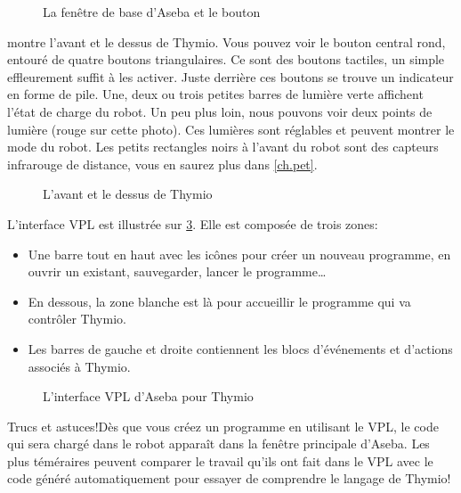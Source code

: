 \begin{figure}
\begin{center}
\caption{La fenêtre de base d'Aseba et le bouton }\label{fig.Aseba}
\end{center}
\end{figure} 


 montre l'avant et le dessus de Thymio. Vous pouvez voir le bouton central rond, entouré de quatre boutons triangulaires. Ce sont des boutons tactiles, un simple effleurement suffit à les activer. Juste derrière ces boutons se trouve un indicateur en forme de pile. Une, deux ou trois petites barres de lumière verte affichent l'état de charge du robot. Un peu plus loin, nous pouvons voir deux points de lumière (rouge sur cette photo). Ces lumières sont réglables et peuvent montrer le mode du robot. Les petits rectangles noirs à l'avant du robot sont des capteurs infrarouge de distance, vous en saurez plus dans \cref{ch.pet}.

\begin{figure}[h]
\begin{center}
\caption{L'avant et le dessus de Thymio}\label{fig.front}
\end{center}
\end{figure} 


L'interface VPL est illustrée sur \cref{fig.gui}. Elle est composée de trois zones:

\begin{itemize}
	\item Une barre tout en haut avec les icônes pour créer un nouveau programme, en ouvrir un existant, sauvegarder, lancer le programme\ldots
	\item En dessous, la zone blanche est là pour accueillir le programme qui va contrôler Thymio.
	\item Les barres de gauche et droite contiennent les blocs d'événements et d'actions associés à Thymio.
\end{itemize}

\begin{figure}[hbt]
\caption{L'interface VPL d'Aseba pour Thymio}\label{fig.gui}
\end{figure}

\begin{bclogo}[couleur = blue!30, arrondi = 0.1, logo = \bcinfo, ombre = true]{Trucs et astuces!}Dès que vous créez un programme en utilisant le VPL, le code qui sera chargé dans le robot apparaît dans la fenêtre principale d'Aseba. Les plus téméraires peuvent comparer le travail qu'ils ont fait dans le VPL avec le code généré automatiquement pour essayer de comprendre le langage de Thymio!
\end{bclogo}

